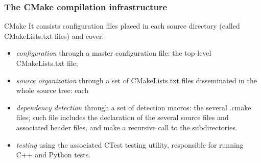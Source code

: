 \documentclass[8pt]{beamer}
\begin{document}
\begin{frame}
  \frametitle{The CMake compilation infrastructure}
  \begin{block}{CMake}
    It consists configuration files placed in each source directory (called CMakeLists.txt files) and cover:
    \begin{itemize}
    \item \emph{configuration} through a master configuration file: the top-level CMakeLists.txt file;
    \item \emph{source organization} through a set of CMakeLists.txt files disseminated in the whole source tree: each
    \item \emph{dependency detection} through a set of detection macros: the several .cmake files;
        such file includes the declaration of the several source files and associated header files, and make a recursive call to the subdirectories.
    \item \emph{testing} using the associated CTest testing utility, responsible for running C++ and Python tests.
    \end{itemize}
  \end{block}
\end{frame}
\end{document}
